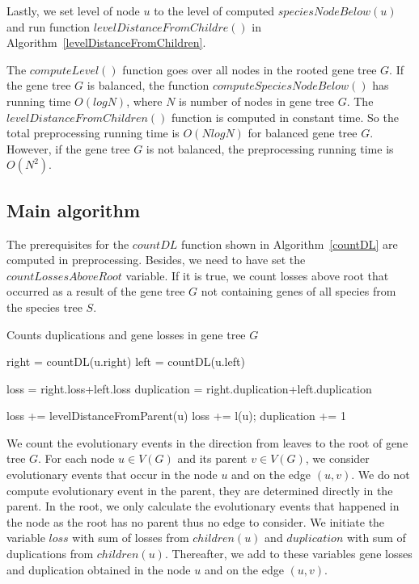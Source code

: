 Lastly, we set level of node $u$ to the level of computed $speciesNodeBelow(u)$ and run function $levelDistanceFromChildre()$ in Algorithm~\ref{levelDistanceFromChildren}.

The $computeLevel()$ function goes over all nodes in the rooted gene tree $G$. If the gene tree $G$ is balanced, the function $computeSpeciesNodeBelow()$ has running time $O(log N)$, where $N$ is number of nodes in gene tree $G$. The $levelDistanceFromChildren()$ function is computed in constant time. So the total preprocessing running time is $O(N log N)$ for balanced gene tree $G$. However, if the gene tree $G$ is not balanced, the preprocessing running time is $O(N^2)$.

\subsection{Main algorithm} \label{main_algorithm}

The prerequisites for the $countDL$ function shown in Algorithm~\ref{countDL} are computed in preprocessing. Besides, we need to have set the $countLossesAboveRoot$ variable. If it is true, we count losses above root that occurred as a result of the gene tree $G$ not containing genes of all species from the species tree $S$. 

\begin{algorithm}
\caption{Counts duplications and gene losses in gene tree $G$} 
\label{countDL}
\begin{algorithmic}[1]
		\State right = countDL(u.right)
		\State left = countDL(u.left)
	\EndIf

	\State loss = right.loss+left.loss
	\State duplication = right.duplication+left.duplication

	\State loss += levelDistanceFromParent(u)
		\State loss += l(u); 
	\EndIf
		\State duplication += 1
	\EndIf

\EndFunction
\end{algorithmic}
\end{algorithm}

We count the evolutionary events in the direction from leaves to the root of gene tree $G$. For each node $u \in V(G)$ and its parent $v \in V(G)$, we consider evolutionary events that occur in the node $u$ and on the edge $(u, v)$. We do not compute evolutionary event in the parent, they are determined directly in the parent. In the root, we only calculate the evolutionary events that happened in the node as the root has no parent thus no edge to consider. We initiate the variable $loss$ with sum of losses from $children(u)$ and $duplication$ with sum of duplications from $children(u)$. Thereafter, we add to these variables gene losses and duplication obtained in the node $u$ and on the edge $(u, v)$.

